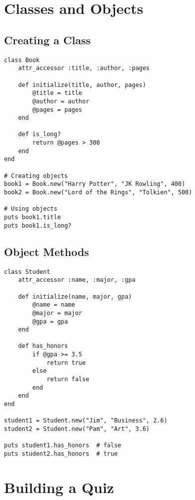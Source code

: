 \documentclass[12pt,a4paper]{article}
\begin{document}
\section{Classes and Objects}

\subsection{Creating a Class}

\begin{lstlisting}
class Book
    attr_accessor :title, :author, :pages
    
    def initialize(title, author, pages)
        @title = title
        @author = author
        @pages = pages
    end
    
    def is_long?
        return @pages > 300
    end
end

# Creating objects
book1 = Book.new("Harry Potter", "JK Rowling", 400)
book2 = Book.new("Lord of the Rings", "Tolkien", 500)

# Using objects
puts book1.title
puts book1.is_long?
\end{lstlisting}

\subsection{Object Methods}

\begin{lstlisting}
class Student
    attr_accessor :name, :major, :gpa
    
    def initialize(name, major, gpa)
        @name = name
        @major = major
        @gpa = gpa
    end
    
    def has_honors
        if @gpa >= 3.5
            return true
        else
            return false
        end
    end
end

student1 = Student.new("Jim", "Business", 2.6)
student2 = Student.new("Pam", "Art", 3.6)

puts student1.has_honors  # false
puts student2.has_honors  # true
\end{lstlisting}

\section{Building a Quiz}
\end{document}
